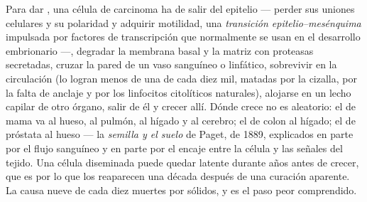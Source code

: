 \begin{definition}\label{def:b3:cancer-biology:metastasis}
Para dar , una célula de carcinoma ha de salir del epitelio ---
perder sus uniones celulares y su polaridad y adquirir motilidad, una
\emph{transición epitelio--mesénquima} impulsada por factores de
transcripción que normalmente se usan en el desarrollo embrionario ---,
degradar la membrana basal y la matriz con proteasas secretadas, cruzar
la pared de un vaso sanguíneo o linfático, sobrevivir en la circulación
(lo logran menos de una de cada diez mil, matadas por la cizalla, por la
falta de anclaje y por los linfocitos citolíticos naturales), alojarse en
un lecho capilar de otro órgano, salir de él y crecer allí. Dónde crece
no es aleatorio: el  de mama va al hueso, al pulmón, al hígado y al
cerebro; el de colon al hígado; el de próstata al hueso --- la
\emph{semilla y el suelo} de Paget, de 1889, explicados en parte por el
flujo sanguíneo y en parte por el encaje entre la célula y las señales
del tejido. Una célula diseminada puede quedar latente durante años antes
de crecer, que es por lo que los  reaparecen una década después
de una curación aparente. La  causa nueve de cada diez muertes
por  sólidos, y es el paso peor comprendido.
\end{definition}

